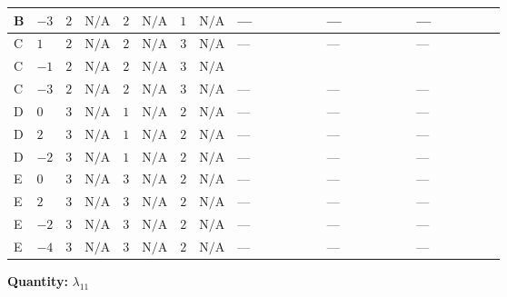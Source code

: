 \documentclass[8pt]{article}
\begin{document}
\begin{landscape}
\begin{longtable}{@{}llcccccc >{\raggedright\arraybackslash}p{0.21\linewidth} >{\raggedright\arraybackslash}p{0.21\linewidth} >{\raggedright\arraybackslash}p{0.21\linewidth}@{}}
\midrule
B & $-3$ & $2$ & $\text{N/A}$ & $2$ & $\text{N/A}$ & $1$ & $\text{N/A}$ & --- & --- & --- \\
\midrule
C & $1$ & $2$ & $\text{N/A}$ & $2$ & $\text{N/A}$ & $3$ & $\text{N/A}$ & --- & --- & --- \\
\midrule
C & $-1$ & $2$ & $\text{N/A}$ & $2$ & $\text{N/A}$ & $3$ & $\text{N/A}$ & \scriptsize\adjustbox{max width=\linewidth}{$\begin{gathered} 4 {\lambda_{9}} (\left({\lambda_{10}}\right)^{*}+5 \left({\lambda_{11}}\right)^{*})\end{gathered}$} & \scriptsize\adjustbox{max width=\linewidth}{$\begin{gathered} -9 {g_2}^2 {\lambda_{11}}\end{gathered}$} & \scriptsize\adjustbox{max width=\linewidth}{$\begin{gathered} -3 {g_1}^2 {\lambda_{11}}\end{gathered}$} \\
\midrule
C & $-3$ & $2$ & $\text{N/A}$ & $2$ & $\text{N/A}$ & $3$ & $\text{N/A}$ & --- & --- & --- \\
\midrule
D & $0$ & $3$ & $\text{N/A}$ & $1$ & $\text{N/A}$ & $2$ & $\text{N/A}$ & --- & --- & --- \\
\midrule
D & $2$ & $3$ & $\text{N/A}$ & $1$ & $\text{N/A}$ & $2$ & $\text{N/A}$ & --- & --- & --- \\
\midrule
D & $-2$ & $3$ & $\text{N/A}$ & $1$ & $\text{N/A}$ & $2$ & $\text{N/A}$ & --- & --- & --- \\
\midrule
E & $0$ & $3$ & $\text{N/A}$ & $3$ & $\text{N/A}$ & $2$ & $\text{N/A}$ & --- & --- & --- \\
\midrule
E & $2$ & $3$ & $\text{N/A}$ & $3$ & $\text{N/A}$ & $2$ & $\text{N/A}$ & --- & --- & --- \\
\midrule
E & $-2$ & $3$ & $\text{N/A}$ & $3$ & $\text{N/A}$ & $2$ & $\text{N/A}$ & --- & --- & --- \\
\midrule
E & $-4$ & $3$ & $\text{N/A}$ & $3$ & $\text{N/A}$ & $2$ & $\text{N/A}$ & --- & --- & --- \\
\midrule
\bottomrule
\end{longtable}
\clearpage
\noindent\textbf{Quantity: }$\lambda_{11}$\par\smallskip

\end{landscape}
\end{document}
